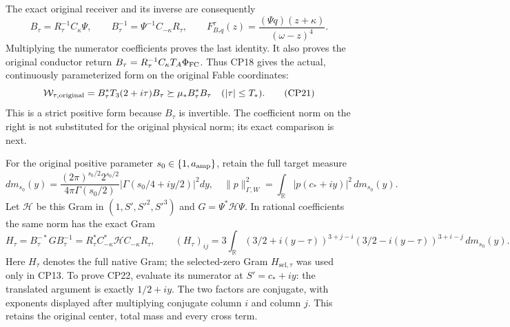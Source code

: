 \documentclass[11pt]{article}
\providecommand{\W}{\mathcal W}
\newcommand{\R}{\mathbb R}
\begin{document}
The exact original receiver and its inverse are consequently
\begin{equation}
B_\tau=R_\tau^{-1}C_\kappa\Psi,\qquad
B_\tau^{-1}=\Psi^{-1}C_{-\kappa}R_\tau,\qquad
F_{B_\tau q}^\tau(z)=\frac{(\Psi q)(z+\kappa)}{(\omega-z)^4}.
\tag{CP20}
\end{equation}
Multiplying the numerator coefficients proves the last identity.
It also proves the original conductor return
$B_\tau=R_\tau^{-1}C_\kappa T_A\Phi_{\rm FC}$.
Thus CP18 gives the actual, continuously parameterized form
on the original Fable coordinates:
\begin{equation}
\W_{\tau,\rm original}
=B_\tau^*T_3(2+i\tau)B_\tau
\succeq\mu_* B_\tau^*B_\tau
\quad(|\tau|\le T_*).
\tag{CP21}
\end{equation}
This is a strict positive form because $B_\tau$ is invertible.
The coefficient norm on the right is not substituted for
the original physical norm; its exact comparison is next.

For the original positive parameter $s_0\in\{1,a_{\rm amp}\}$,
retain the full target measure
\[
dm_{s_0}(y)=
\frac{(2\pi)^{s_0/2}2^{s_0/2}}{4\pi\Gamma(s_0/2)}
 \left|\Gamma(s_0/4+iy/2)\right|^2dy,
\quad
\|p\|_{\Gamma,W}^2=\int_{\R}|p(c_*+iy)|^2\,dm_{s_0}(y).
\]
Let $\mathcal H$ be this Gram in $(1,S',S'^2,S'^3)$ and
$G=\Psi^*\mathcal H\Psi$. In rational coefficients the same
norm has the exact Gram
\begin{equation}
H_\tau=B_\tau^{-*}GB_\tau^{-1}
=R_\tau^*C_{-\kappa}^*\mathcal HC_{-\kappa}R_\tau,\qquad
(H_\tau)_{ij}
=3\int_{\R}
 (3/2+i(y-\tau))^{3+j-i}
 (3/2-i(y-\tau))^{3+i-j}\,dm_{s_0}(y).
\tag{CP22}
\end{equation}
Here $H_\tau$ denotes the full native Gram; the selected-zero
Gram $H_{\mathrm{sel},\tau}$ was used only in CP13.
To prove CP22, evaluate its numerator at
$S'=c_*+iy$: the translated argument is exactly $1/2+iy$.
The two factors are conjugate, with exponents displayed
after multiplying conjugate column $i$ and column $j$.
This retains the original center, total mass and every cross term.
\end{document}
